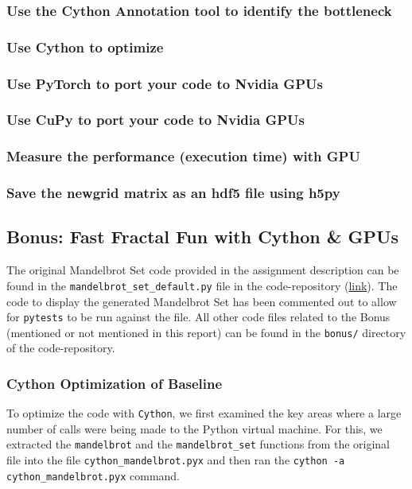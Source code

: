 \documentclass[a4paper,12pt]{article}
\begin{document}
\subsubsection{Use the Cython Annotation tool to identify the bottleneck}
\subsubsection{Use Cython to optimize}
\subsubsection{Use PyTorch to port your code to Nvidia GPUs}
\subsubsection{Use CuPy to port your code to Nvidia GPUs}
\subsubsection{Measure the performance (execution time) with GPU}
\subsubsection{Save the newgrid matrix as an hdf5 file using h5py }

\subsection{Bonus: Fast Fractal Fun with Cython \& GPUs}
The original Mandelbrot Set code provided in the assignment description can be found in the \verb|mandelbrot_set_default.py| file in the code-repository (\href{https://github.com/paulmyr/DD2358-HPC25/blob/master/03_compgpu/bonus/mandelbrot_set_default.py}{link}). The code to display the generated Mandelbrot Set has been commented out to allow for \verb|pytests| to be run against the file. All other code files related to the Bonus (mentioned or not mentioned in this report) can be found in the \verb|bonus/| directory of the code-repository.

\subsubsection{Cython Optimization of Baseline}
To optimize the code with \verb|Cython|, we first examined the key areas where a large number of calls were being made to the Python virtual machine. For this, we extracted the \verb|mandelbrot| and the \verb|mandelbrot_set| functions from the original file into the file \verb|cython_mandelbrot.pyx| and then ran the \verb|cython -a cython_mandelbrot.pyx| command. 
\end{document}

